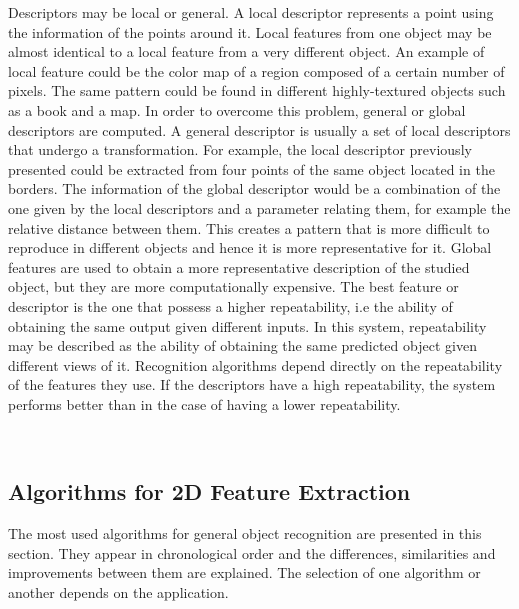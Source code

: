 Descriptors may be local or general. 
A local descriptor represents a point using the information of the points around it. 
Local features from one object may be almost identical to a local feature from a very different object. 
An example of local feature could be the color map of a region composed of a certain number of pixels. 
The same pattern could be found in different highly-textured objects such as a book and a map. 
In order to overcome this problem, general or global descriptors are computed. 
A general descriptor is usually a set of local descriptors that undergo a transformation. 
For example, the local descriptor previously presented could be extracted from four points of the same object located in the borders. 
The information of the global descriptor would be a combination of the one given by the local descriptors and a parameter relating them, for example the relative distance between them. 
This creates a pattern that is more difficult to reproduce in different objects and hence it is more representative for it. 
Global features are used to obtain a more representative description of the studied object, but they are more computationally expensive. 
The best feature or descriptor is the one that possess a higher repeatability, i.e the ability of obtaining the same output given different inputs. 
In this system, repeatability may be described as the ability of obtaining the same predicted object given different views of it. 
Recognition algorithms depend directly on the repeatability of the features they use. 
If the descriptors have a high repeatability, the system performs better than in the case of having a lower repeatability. 

\\

\subsection{Algorithms for 2D Feature Extraction}
\label{2d_features}


The most used algorithms for general object recognition are presented in this section. 
They appear in chronological order and the differences, similarities and improvements between them are explained. 
The selection of one algorithm or another depends on the application.


